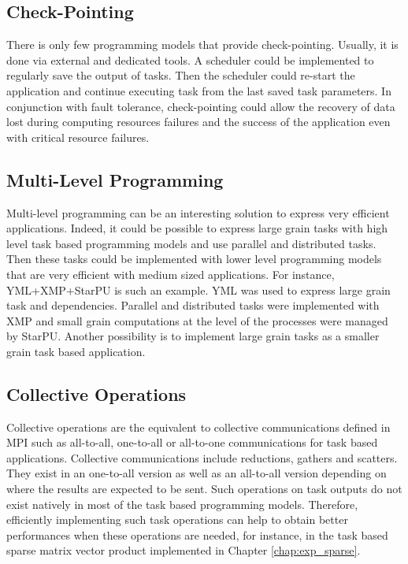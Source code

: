 \subsection{Check-Pointing}
There is only few programming models that provide check-pointing.
Usually, it is done via external and dedicated tools.
A scheduler could be implemented to regularly save the output of tasks.
Then the scheduler could re-start the application and continue executing task from the last saved task parameters.
In conjunction with fault tolerance, check-pointing could allow the recovery of data lost during computing resources failures and the success of the application even with critical resource failures.

\subsection{Multi-Level Programming}
Multi-level programming can be an interesting solution to express very efficient applications.
Indeed, it could be possible to express large grain tasks with high level task based programming models and use parallel and distributed tasks.
Then these tasks could be implemented with lower level programming models that are very efficient with medium sized applications.
For instance, YML+XMP+StarPU is such an example.
YML was used to express large grain task and dependencies.
Parallel and distributed tasks were implemented with XMP and small grain computations at the level of the processes were managed by StarPU.
Another possibility is to implement large grain tasks as a smaller grain task based application.

\subsection{Collective Operations}
Collective operations are the equivalent to collective communications defined in MPI such as all-to-all, one-to-all or all-to-one communications for task based applications.
Collective communications include reductions, gathers and scatters.
They exist in an one-to-all version as well as an all-to-all version depending on where the results are expected to be sent.
Such operations on task outputs do not exist natively in most of the task based programming models.
Therefore, efficiently implementing such task operations can help to obtain better performances when these operations are needed, for instance, in the task based sparse matrix vector product implemented in Chapter \ref{chap:exp_sparse}.

